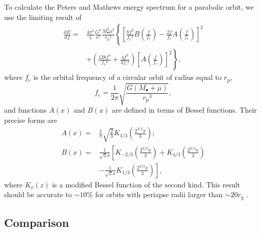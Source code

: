 \documentclass[useAMS,usedcolumn,usegraphicx,usenatbib]{mn2e}
\newcommand{\sub}[1]{\ensuremath{_\mathrm{#1}}}
\newcommand{\dd}{\ensuremath{\mathrm{d}}}
\newcommand{\diff}[2]{\ensuremath{\frac{\dd {#1}}{\dd {#2}}}}
\newcommand{\recip}[1]{\ensuremath{\frac{1}{#1}}}
\begin{document}
To calculate the Peters and Mathews energy spectrum for a parabolic orbit, we use the limiting result of \citet{Turner1977}
\begin{align}
\diff{E}{f} = {} & \frac{4\pi^2}{5}\frac{G^3}{c^5}\frac{M_\bullet^2\mu^2}{r\sub{p}^2}\left\{\left[\frac{8f^2}{f\sub{c}^2}B\left(\frac{f}{f\sub{c}}\right) - \frac{2f}{f\sub{c}}A\left(\frac{f}{f\sub{c}}\right)\right]^2 \right. \nonumber \\
 & \left. + \left(\frac{128f^4}{f\sub{c}^4} + \frac{4f^2}{3f\sub{c}^2}\right)\left[A\left(\frac{f}{f\sub{c}}\right)\right]^2\right\},
\label{eq:PM_dEdf}
\end{align}
where $f\sub{c}$ is the orbital frequency of a circular orbit of radius equal to $r\sub{p}$,
\begin{equation}
f\sub{c} = \recip{2\pi}\sqrt{\frac{G(M_\bullet + \mu)}{r\sub{p}^3}},
\end{equation}
and functions $A\left(x\right)$ and $B\left(x\right)$ are defined in terms of Bessel functions. Their precise forms are \citep{Berry2010}
\begin{align}
A\left(x\right) = {} & \recip{\pi}\sqrt{\frac{2}{3}}K_{1/3}\left(\frac{2^{3/2}x}{3}\right); \\
B\left(x\right) = {} & \recip{\sqrt{3}\pi}\left[K_{-2/3}\left(\frac{2^{3/2}x}{3}\right) + K_{4/3}\left(\frac{2^{3/2}x}{3}\right) \right. \nonumber \\
 {} & - \left. \recip{\sqrt{2}x}K_{1/3}\left(\frac{2^{3/2}x}{3}\right)\right],
\end{align}
where $K_\nu(z)$ is a modified Bessel function of the second kind. This result should be accurate to $\sim10\%$ for orbits with periapse radii larger than $\sim20r\sub{g}$ \citep{Berry2010}.

\subsection{Comparison}
\end{document}
